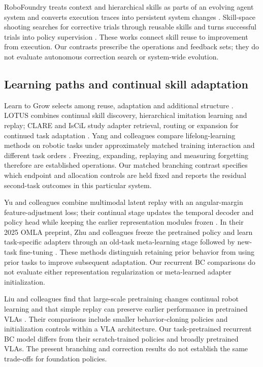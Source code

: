 \documentclass[10pt,letterpaper]{article}
\begin{document}
RoboFoundry treats context and hierarchical skills as parts of an
evolving agent system and converts execution traces into persistent
system changes
\cite{liang2026robofoundrysystemaspolicyevolutionselflearning}.
Skill-space shooting searches for corrective trials through reusable
skills and turns successful trials into policy supervision
\cite{rui2026skillspaceshootingautonomousrobot}. These works connect
skill reuse to improvement from execution. Our contrasts prescribe the
operations and feedback sets; they do not evaluate autonomous correction
search or system-wide evolution.

\subsection{Learning paths and continual skill
adaptation}\label{learning-paths-and-continual-skill-adaptation}

Learn to Grow selects among reuse, adaptation and additional structure
\cite{pmlr-v97-li19m}. LOTUS combines continual skill discovery,
hierarchical imitation learning and replay; CLARE and IsCiL study
adapter retrieval, routing or expansion for continued task adaptation
\cite{wan2024lotuscontinualimitationlearning, roemer2026clare, lee2024iscil}.
Yang and colleagues compare lifelong-learning methods on robotic tasks
under approximately matched training interaction and different task
orders \cite{pmlr-v164-yang22a}. Freezing, expanding, replaying and
measuring forgetting therefore are established operations. Our matched
branching contrast specifies which endpoint and allocation controls are
held fixed and reports the residual second-task outcomes in this
particular system.

Yu and colleagues combine multimodal latent replay with an
angular-margin feature-adjustment loss; their continual stage updates
the temporal decoder and policy head while keeping the earlier
representation modules frozen
\cite{yu2026lifelongimitationlearningmultimodal}. In their 2025 OMLA
preprint, Zhu and colleagues freeze the pretrained policy and learn
task-specific adapters through an old-task meta-learning stage followed
by new-task fine-tuning
\cite{zhu2025efficientcontinualadaptationpretrained}. These methods
distinguish retaining prior behavior from using prior tasks to improve
subsequent adaptation. Our recurrent BC comparisons do not evaluate
either representation regularization or meta-learned adapter
initialization.

Liu and colleagues find that large-scale pretraining changes continual
robot learning and that simple replay can preserve earlier performance
in pretrained VLAs \cite{liu2026pretrainedcontinual}. Their comparisons
include smaller behavior-cloning policies and initialization controls
within a VLA architecture. Our task-pretrained recurrent BC model
differs from their scratch-trained policies and broadly pretrained VLAs.
The present branching and correction results do not establish the same
trade-offs for foundation policies.
\end{document}
